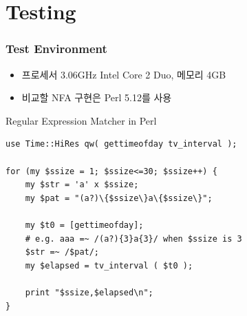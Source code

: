 \section{Testing}

\begin{frame}[fragile]
    \frametitle{Test Environment}

    \begin{itemize}
        \item 프로세서 3.06GHz Intel Core 2 Duo, 메모리 4GB 
        \item {} 비교할 NFA 구현은 Perl 5.12를 사용
    \end{itemize}
    \begin{block}{Regular Expression Matcher in Perl}
    \small
    \begin{Verbatim}[xleftmargin=10mm]
use Time::HiRes qw( gettimeofday tv_interval );

for (my $ssize = 1; $ssize<=30; $ssize++) {
    my $str = 'a' x $ssize;
    my $pat = "(a?)\{$ssize\}a\{$ssize\}";

    my $t0 = [gettimeofday];
    # e.g. aaa =~ /(a?){3}a{3}/ when $ssize is 3
    $str =~ /$pat/;
    my $elapsed = tv_interval ( $t0 );

    print "$ssize,$elapsed\n";
}
    \end{Verbatim}
    \end{block}

\end{frame}

